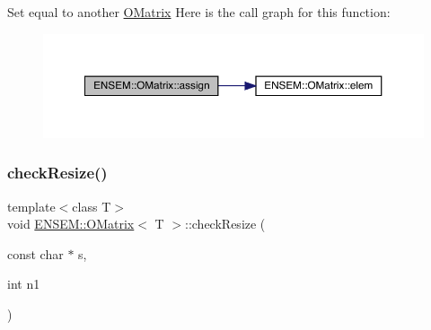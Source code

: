 Set equal to another \mbox{\hyperlink{classENSEM_1_1OMatrix}{O\+Matrix}} Here is the call graph for this function\+:
\nopagebreak
\begin{figure}[H]
\begin{center}
\leavevmode
\includegraphics[width=350pt]{dd/d80/classENSEM_1_1OMatrix_a37ed216c9ecfe42f7a357573699b3bfc_cgraph}
\end{center}
\end{figure}
\mbox{\label{classENSEM_1_1OMatrix_a04fb9c7a5ca8da8a54aff3a8bafec571}} 
\subsubsection{\texorpdfstring{checkResize()}{checkResize()}\hspace{0.1cm}{\footnotesize\ttfamily [1/6]}}
{\footnotesize\ttfamily template$<$class T$>$ \\
void \mbox{\hyperlink{classENSEM_1_1OMatrix}{E\+N\+S\+E\+M\+::\+O\+Matrix}}$<$ T $>$\+::check\+Resize (\begin{DoxyParamCaption}\item[{const char $\ast$}]{s,  }\item[{int}]{n1 }\end{DoxyParamCaption})\hspace{0.3cm}{\ttfamily [inline]}}

